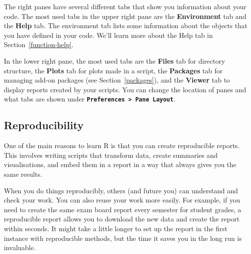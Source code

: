 \documentclass[
  oneside]{book}
\begin{document}
The right panes have several different tabs that show you information about your code. The most used tabs in the upper right pane are the \textbf{Environment} tab and the \textbf{Help} tab. The environment tab lists some information about the objects{} that you have defined in your code. We'll learn more about the Help tab in Section~\ref{function-help}.

In the lower right pane, the most used tabs are the \textbf{Files} tab for directory structure, the \textbf{Plots} tab for plots made in a script, the \textbf{Packages} tab for managing add-on packages (see Section~\ref{packages}), and the \textbf{Viewer} tab to display reports created by your scripts. You can change the location of panes and what tabs are shown under \textbf{\texttt{Preferences\ \textgreater{}\ Pane\ Layout}}.

\subsection{Reproducibility}\label{intro-reproducibility}

One of the main reasons to learn R is that you can create reproducible{} reports. This involves writing scripts that transform data, create summaries and visualisations, and embed them in a report in a way that always gives you the same results.

When you do things reproducibly, others (and future you) can understand and check your work. You can also reuse your work more easily. For example, if you need to create the same exam board report every semester for student grades, a reproducible report allows you to download the new data and create the report within seconds. It might take a little longer to set up the report in the first instance with reproducible methods, but the time it saves you in the long run is invaluable.
\end{document}
